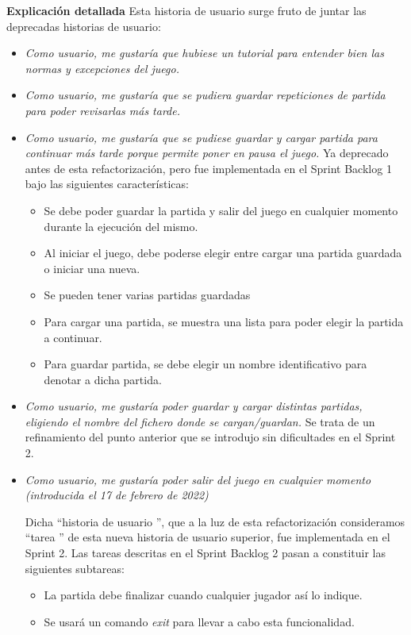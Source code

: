\documentclass[../../FINAL/Scrum/SCRUM.tex]{subfiles}
\begin{document}
\textbf{Explicación detallada}
Esta historia de usuario surge fruto de juntar las deprecadas historias de usuario:
\begin{itemize}
\item  \textit{Como usuario, me gustaría que hubiese un tutorial para entender bien las normas y excepciones del juego.} 

\item  \textit{Como usuario, me gustaría que se pudiera guardar repeticiones de partida para poder revisarlas más tarde.} 

\item  \textit{Como usuario, me gustaría que se pudiese guardar y cargar partida para continuar más tarde porque permite poner en pausa el juego.}
    Ya deprecado antes de esta refactorización, pero fue implementada en el Sprint Backlog 1 bajo las siguientes características:
    \begin{itemize}
    \item Se debe poder guardar la partida y salir del juego en cualquier momento durante la ejecución del mismo.
     \item Al iniciar el juego, debe poderse elegir entre cargar una partida guardada o iniciar una nueva.
     \item Se pueden tener varias partidas guardadas
     \item Para cargar una partida, se muestra una lista para poder elegir la partida a continuar.
     \item Para guardar partida, se debe elegir un nombre identificativo para denotar a dicha partida.
    \end{itemize}
\item  \textit{Como usuario, me gustaría poder guardar y cargar distintas partidas, eligiendo el nombre del fichero donde se cargan/guardan. }
    Se trata de un refinamiento del punto anterior que se introdujo sin dificultades en el Sprint 2.
    
\item  \textit{Como usuario, me gustaría poder salir del juego en cualquier momento (introducida el 17 de febrero de 2022)} 

    Dicha  ``historia de usuario '', que a la luz de esta refactorización consideramos  ``tarea '' de esta nueva historia de usuario superior, fue implementada en el Sprint 2. Las tareas descritas en el Sprint Backlog 2 pasan a constituir las siguientes subtareas:
    \begin{itemize}
    \item La partida debe finalizar cuando cualquier jugador así lo indique.
    \item Se usará un comando  \textit{exit}  para llevar a cabo esta funcionalidad.
    \end{itemize}
\end{itemize}

\end{document}

